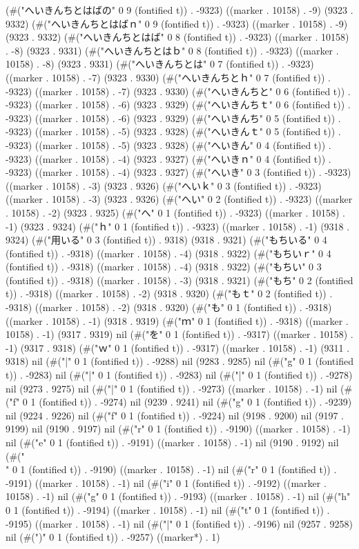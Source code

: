 {(#("へいきんちとはばの" 0 9 (fontified t)) . -9323) ((marker . 10158) . -9) (9323 . 9332) (#("へいきんちとはばｎ" 0 9 (fontified t)) . -9323) ((marker . 10158) . -9) (9323 . 9332) (#("へいきんちとはば" 0 8 (fontified t)) . -9323) ((marker . 10158) . -8) (9323 . 9331) (#("へいきんちとはｂ" 0 8 (fontified t)) . -9323) ((marker . 10158) . -8) (9323 . 9331) (#("へいきんちとは" 0 7 (fontified t)) . -9323) ((marker . 10158) . -7) (9323 . 9330) (#("へいきんちとｈ" 0 7 (fontified t)) . -9323) ((marker . 10158) . -7) (9323 . 9330) (#("へいきんちと" 0 6 (fontified t)) . -9323) ((marker . 10158) . -6) (9323 . 9329) (#("へいきんちｔ" 0 6 (fontified t)) . -9323) ((marker . 10158) . -6) (9323 . 9329) (#("へいきんち" 0 5 (fontified t)) . -9323) ((marker . 10158) . -5) (9323 . 9328) (#("へいきんｔ" 0 5 (fontified t)) . -9323) ((marker . 10158) . -5) (9323 . 9328) (#("へいきん" 0 4 (fontified t)) . -9323) ((marker . 10158) . -4) (9323 . 9327) (#("へいきｎ" 0 4 (fontified t)) . -9323) ((marker . 10158) . -4) (9323 . 9327) (#("へいき" 0 3 (fontified t)) . -9323) ((marker . 10158) . -3) (9323 . 9326) (#("へいｋ" 0 3 (fontified t)) . -9323) ((marker . 10158) . -3) (9323 . 9326) (#("へい" 0 2 (fontified t)) . -9323) ((marker . 10158) . -2) (9323 . 9325) (#("へ" 0 1 (fontified t)) . -9323) ((marker . 10158) . -1) (9323 . 9324) (#("ｈ" 0 1 (fontified t)) . -9323) ((marker . 10158) . -1) (9318 . 9324) (#("用いる" 0 3 (fontified t)) . 9318) (9318 . 9321) (#("もちいる" 0 4 (fontified t)) . -9318) ((marker . 10158) . -4) (9318 . 9322) (#("もちいｒ" 0 4 (fontified t)) . -9318) ((marker . 10158) . -4) (9318 . 9322) (#("もちい" 0 3 (fontified t)) . -9318) ((marker . 10158) . -3) (9318 . 9321) (#("もち" 0 2 (fontified t)) . -9318) ((marker . 10158) . -2) (9318 . 9320) (#("もｔ" 0 2 (fontified t)) . -9318) ((marker . 10158) . -2) (9318 . 9320) (#("も" 0 1 (fontified t)) . -9318) ((marker . 10158) . -1) (9318 . 9319) (#("ｍ" 0 1 (fontified t)) . -9318) ((marker . 10158) . -1) (9317 . 9319) nil (#("を" 0 1 (fontified t)) . -9317) ((marker . 10158) . -1) (9317 . 9318) (#("ｗ" 0 1 (fontified t)) . -9317) ((marker . 10158) . -1) (9311 . 9318) nil (#("|" 0 1 (fontified t)) . -9288) nil (9283 . 9285) nil (#("g" 0 1 (fontified t)) . -9283) nil (#("|" 0 1 (fontified t)) . -9283) nil (#("|" 0 1 (fontified t)) . -9278) nil (9273 . 9275) nil (#("|" 0 1 (fontified t)) . -9273) ((marker . 10158) . -1) nil (#("f" 0 1 (fontified t)) . -9274) nil (9239 . 9241) nil (#("g" 0 1 (fontified t)) . -9239) nil (9224 . 9226) nil (#("f" 0 1 (fontified t)) . -9224) nil (9198 . 9200) nil (9197 . 9199) nil (9190 . 9197) nil (#("r" 0 1 (fontified t)) . -9190) ((marker . 10158) . -1) nil (#("e" 0 1 (fontified t)) . -9191) ((marker . 10158) . -1) nil (9190 . 9192) nil (#("\\" 0 1 (fontified t)) . -9190) ((marker . 10158) . -1) nil (#("r" 0 1 (fontified t)) . -9191) ((marker . 10158) . -1) nil (#("i" 0 1 (fontified t)) . -9192) ((marker . 10158) . -1) nil (#("g" 0 1 (fontified t)) . -9193) ((marker . 10158) . -1) nil (#("h" 0 1 (fontified t)) . -9194) ((marker . 10158) . -1) nil (#("t" 0 1 (fontified t)) . -9195) ((marker . 10158) . -1) nil (#("|" 0 1 (fontified t)) . -9196) nil (9257 . 9258) nil (#(")" 0 1 (fontified t)) . -9257) ((marker*) . 1) }
